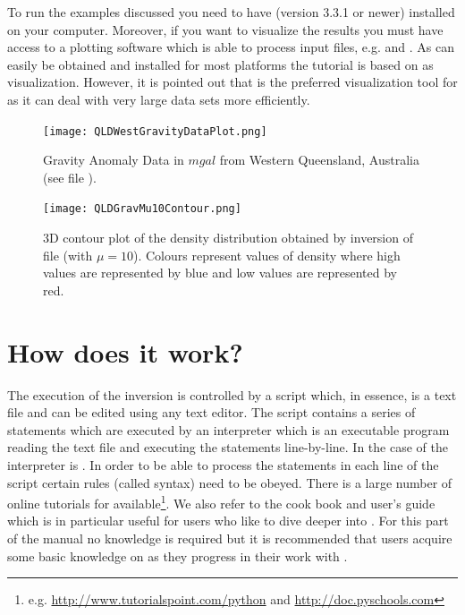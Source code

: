 To run the examples discussed you need to have \escript (version 3.3.1 or
newer) installed on your computer.
Moreover, if you want to visualize the results you must have access to a
plotting software which is able to process \VTK input files, e.g. \mayavi and \VisIt.
As \mayavi can easily be obtained and installed for most platforms the
tutorial is based on \mayavi as visualization. However, it is pointed out 
that \VisIt is the preferred visualization tool for \escript as it can deal
with very large data sets more efficiently.
    
\begin{figure}
\centering
\texttt{[image: QLDWestGravityDataPlot.png]}
\caption{Gravity Anomaly Data in $mgal$ from Western Queensland, Australia
    (see file ). }
\label{FIG:P1:GRAV:0}
\end{figure}

\begin{figure}
\centering%
\texttt{[image: QLDGravMu10Contour.png]}%
\caption{3D contour plot of the density distribution obtained by inversion of
    file  (with $\mu=10$).
    Colours represent values of density where high values are represented by
    blue and low values are represented by red. }
\label{FIG:P1:GRAV:1}
\end{figure}

\section{How does it work?}
The execution of the inversion is controlled by a script which, in essence, is
a text file and can be edited using any text editor.
The script contains a series of statements which are executed by an
interpreter which is an executable program reading the text file and executing
the statements line-by-line.
In the case of \downunder the interpreter is \Python.
In order to be able to process the statements in each line of the script
certain rules (called syntax) need to be obeyed.
There is a large number of online tutorials for \Python available\footnote{e.g.
\url{http://www.tutorialspoint.com/python} and \url{http://doc.pyschools.com}}.
We also refer to the \escript cook book \cite{ESCRIPTCOOKBOOK} and user's
guide \cite{ESCRIPT} which is in particular useful for users who like to dive
deeper into \downunder.
For this part of the manual no \Python knowledge is required but it is
recommended that users acquire some basic knowledge on \Python as they
progress in their work with \downunder.

